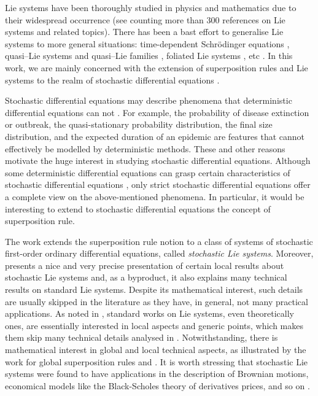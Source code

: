 \documentclass[11pt]{article}
\theoremstyle{plain}
\theoremstyle{definition}
\begin{document}
Lie systems have been thoroughly studied in physics and mathematics due to their widespread occurrence  (see \cite{Dissertationes,LS21} counting more than 300 references on Lie systems and related topics). %
There has been a bast effort to generalise Lie systems to more general situations: time-dependent Schr\"odinger equations \cite{Dissertationes}, quasi--Lie systems \cite{CGL19} and quasi--Lie families \cite{CL15}, foliated Lie systems \cite{CLW22}, etc \cite{CL09}. In this work, we are mainly concerned with the extension of superposition rules and Lie systems to the realm of stochastic differential equations \cite{LO09}. %

Stochastic differential equations may describe phenomena that  deterministic differential equations can not \cite{Al09}. For example, the probability of disease extinction or outbreak, the quasi-stationary probability distribution, the final size distribution, and the expected duration of an epidemic are features that cannot  effectively be modelled by deterministic methods. These and other reasons motivate the huge interest in studying stochastic differential equations. Although some deterministic differential equations can grasp certain characteristics of stochastic differential equations \cite{CFH23}, only strict stochastic differential equations offer a complete view on the above-mentioned phenomena. In particular, it would be interesting to extend to stochastic differential equations the concept of superposition rule. 

The work \cite{LO09} extends the superposition rule notion to a class of systems of stochastic first-order ordinary differential equations, called  {\it stochastic Lie systems}. Moreover, \cite{LO09} presents a nice and very precise presentation of certain local results about stochastic Lie systems and, as a byproduct, it also explains many technical results on standard Lie systems. Despite its mathematical interest, such details are usually skipped in the literature as they have, in general, not many practical applications. As noted in \cite{BM10local-global,LS21}, standard works on Lie systems, even theoretically ones, are essentially interested in local aspects and generic points, which makes them skip many technical details analysed in \cite{LO09}. Notwithstanding, there is mathematical interest in global and local technical aspects, as illustrated by the work \cite{BM10local-global} for global superposition rules and \cite{LO09}. It is worth stressing that stochastic Lie systems were found to have applications in the description of Brownian motions, economical models like the Black-Scholes theory of derivatives prices, and so on \cite{LO09}.
\end{document}
